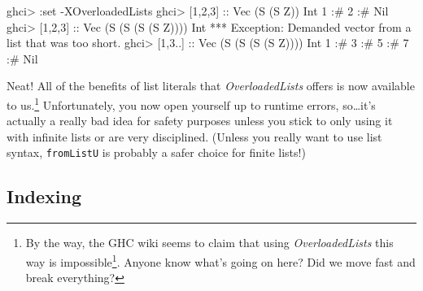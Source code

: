 \documentclass[]{article}
\newenvironment{Shaded}{}{}
\newcommand{\DataTypeTok}[1]{\textcolor[rgb]{0.56,0.13,0.00}{{#1}}}
\newcommand{\DecValTok}[1]{\textcolor[rgb]{0.25,0.63,0.44}{{#1}}}
\newcommand{\OtherTok}[1]{\textcolor[rgb]{0.00,0.44,0.13}{{#1}}}
\newcommand{\FunctionTok}[1]{\textcolor[rgb]{0.02,0.16,0.49}{{#1}}}
\newcommand{\NormalTok}[1]{{#1}}
\renewcommand{\href}[2]{#2\footnote{\url{#1}}}
\begin{document}
\begin{Shaded}
\begin{Highlighting}[]
\NormalTok{ghci}\FunctionTok{>} \FunctionTok{:}\NormalTok{set }\FunctionTok{-}\DataTypeTok{XOverloadedLists}
\NormalTok{ghci}\FunctionTok{>} \NormalTok{[}\DecValTok{1}\NormalTok{,}\DecValTok{2}\NormalTok{,}\DecValTok{3}\NormalTok{]}\OtherTok{ ::} \DataTypeTok{Vec} \NormalTok{(}\DataTypeTok{S} \NormalTok{(}\DataTypeTok{S} \DataTypeTok{Z}\NormalTok{)) }\DataTypeTok{Int}
\DecValTok{1} \FunctionTok{:#} \DecValTok{2} \FunctionTok{:#} \DataTypeTok{Nil}
\NormalTok{ghci}\FunctionTok{>} \NormalTok{[}\DecValTok{1}\NormalTok{,}\DecValTok{2}\NormalTok{,}\DecValTok{3}\NormalTok{]}\OtherTok{ ::} \DataTypeTok{Vec} \NormalTok{(}\DataTypeTok{S} \NormalTok{(}\DataTypeTok{S} \NormalTok{(}\DataTypeTok{S} \NormalTok{(}\DataTypeTok{S} \DataTypeTok{Z}\NormalTok{)))) }\DataTypeTok{Int}
\FunctionTok{***} \DataTypeTok{Exception}\FunctionTok{:} \DataTypeTok{Demanded} \NormalTok{vector from a list that was too short}\FunctionTok{.}
\NormalTok{ghci}\FunctionTok{>} \NormalTok{[}\DecValTok{1}\NormalTok{,}\DecValTok{3}\FunctionTok{..}\NormalTok{]}\OtherTok{ ::} \DataTypeTok{Vec} \NormalTok{(}\DataTypeTok{S} \NormalTok{(}\DataTypeTok{S} \NormalTok{(}\DataTypeTok{S} \NormalTok{(}\DataTypeTok{S} \DataTypeTok{Z}\NormalTok{)))) }\DataTypeTok{Int}
\DecValTok{1} \FunctionTok{:#} \DecValTok{3} \FunctionTok{:#} \DecValTok{5} \FunctionTok{:#} \DecValTok{7} \FunctionTok{:#} \DataTypeTok{Nil}
\end{Highlighting}
\end{Shaded}

Neat! All of the benefits of list literals that \emph{OverloadedLists}
offers is now available to us.\footnote{By the way, the GHC wiki seems
  to claim that
  \href{https://ghc.haskell.org/trac/ghc/wiki/OverloadedLists\#Length-indexedobservedVectors}{using
  \emph{OverloadedLists} this way is impossible}. Anyone know what's
  going on here? Did we move fast and break everything?} Unfortunately,
you now open yourself up to runtime errors, so\ldots{}it's actually a
really bad idea for safety purposes unless you stick to only using it
with infinite lists or are very disciplined. (Unless you really want to
use list syntax, \texttt{fromListU} is probably a safer choice for
finite lists!)

\subsection{Indexing}\label{indexing}
\end{document}
